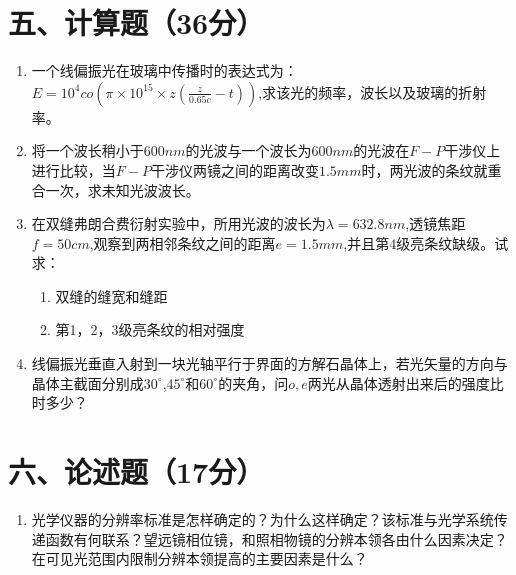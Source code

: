 \documentclass[12pt, a4paper]{article}
\theoremstyle{solution}
\begin{document}
\section*{五、计算题（36分）}
\begin{enumerate}
    \item 一个线偏振光在玻璃中传播时的表达式为：$E=10^4co(\pi\times10^{15}\times z(\frac{z}{0.65c}-t))$,求该光的频率，波长以及玻璃的折射率。
    \item 将一个波长稍小于$600nm$的光波与一个波长为$600nm$的光波在$F-P$干涉仪上进行比较，当$F-P$干涉仪两镜之间的距离改变$1.5mm$时，两光波的条纹就重合一次，求未知光波波长。
    \item 在双缝弗朗合费衍射实验中，所用光波的波长为$\lambda=632.8nm$,透镜焦距$f=50cm$,观察到两相邻条纹之间的距离$e=1.5mm$,并且第4级亮条纹缺级。试求：
    \begin{enumerate}
        \item 双缝的缝宽和缝距
        \item 第1，2，3级亮条纹的相对强度
    \end{enumerate}
    \item 线偏振光垂直入射到一块光轴平行于界面的方解石晶体上，若光矢量的方向与晶体主截面分别成$30^\circ$,$45^\circ$和$60^\circ$的夹角，问$o,e$两光从晶体透射出来后的强度比时多少？
\end{enumerate}
\section*{六、论述题（17分）}
\begin{enumerate}
    \item 光学仪器的分辨率标准是怎样确定的？为什么这样确定？该标准与光学系统传递函数有何联系？望远镜相位镜，和照相物镜的分辨本领各由什么因素决定？在可见光范围内限制分辨本领提高的主要因素是什么？
\end{enumerate}
\end{document}
